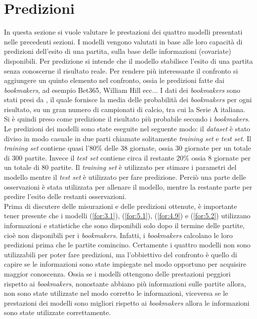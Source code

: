 \section{Predizioni}
In questa sezione si vuole valutare le prestazioni dei quattro modelli presentati nelle precedenti sezioni. I modelli vengono valutati in base alle loro capacità di predizioni dell'esito di una partita, sulla base delle informazioni (covariate) disponibili. Per predizione si intende che il modello stabilisce l'esito di una partita senza conoscerne il risultato reale. Per rendere più interessante il confronto si aggiungere un quinto elemento nel confronto, ossia le predizioni fatte dai \emph{bookmakers}, ad esempio Bet365, William Hill ecc... I dati dei \emph{bookmakers} sono stati presi da \textit{\cite{bet}}, il quale fornisce la media delle probabilità dei \emph{bookmakers} per ogni risultato, su un gran numero di campionati di calcio, tra cui la Serie A italiana. Si è quindi preso come predizione il risultato più probabile secondo i \emph{bookmakers}.\\
Le predizioni dei modelli sono state eseguite nel seguente modo: il \emph{dataset} è stato diviso in modo casuale in due parti chiamate solitamente \emph{training set} e \emph{test set}. Il \emph{training set} contiene quasi l'80\% delle 38 giornate, ossia 30 giornate per un totale di 300 partite. Invece il \emph{test set} contiene circa il restante 20\% ossia 8 giornate per un totale di 80 partite. Il \emph{training set} è utilizzato per stimare i parametri del modello mentre il \emph{test set} è utilizzato per fare predizione. Perciò una parte delle osservazioni è stata utilizzata per allenare il modello, mentre la restante parte per predire l'esito delle restanti osservazioni. \\
Prima di discutere delle misurazioni e delle predizioni ottenute, è importante tener presente che i modelli (\ref{for:3.1}), (\ref{for:5.1}), (\ref{for:4.9}) e (\ref{for:5.2}) utilizzano informazioni e statistiche che sono disponibili solo dopo il termine delle partite, cioè non disponibili per i \emph{bookmakers}. Infatti, i \emph{bookmakers} calcolano le loro predizioni prima che le partite comincino. Certamente i quattro modelli non sono utilizzabili per poter fare predizioni, ma l'obbiettivo del confronto è quello di capire se le informazioni sono state impiegate nel modo opportuno per acquisire maggior conoscenza. Ossia se i modelli ottengono delle prestazioni peggiori rispetto ai \emph{bookmakers}, nonostante abbiano più informazioni sulle partite allora, non sono state utilizzate nel modo corretto le informazioni, viceversa se le prestazioni dei modelli sono migliori rispetto ai \emph{bookmakers} allora le informazioni sono state utilizzate correttamente. \\
